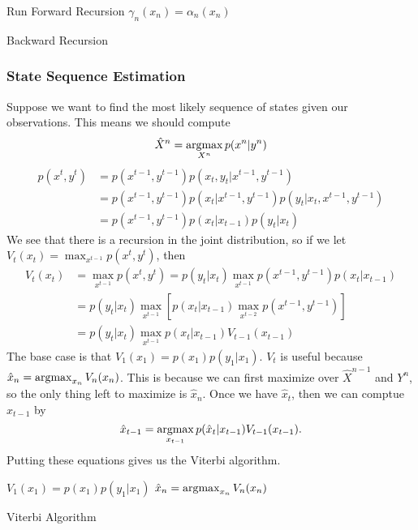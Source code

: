 \begin{gitbook-image}
\begin{algorithm}[H]
	\SetAlgoLined
	Run Forward Recursion\;
	$\gamma_n(x_n) = \alpha_n(x_n)$\;
	\caption{Backward Recursion}
\end{algorithm}
\end{gitbook-image}
\subsubsection{State Sequence Estimation}
Suppose we want to find the most likely sequence of states given our observations.
This means we should compute \[
	\hat{X}^n = \operatorname*{argmax}_{X^n}p(x^n|y^n)
\]
\begin{align*}
	p(x^t, y^t) &= p(x^{t-1}, y^{t-1})p(x_t, y_t|x^{t-1},y^{t-1})\\
	&= p(x^{t-1}, y^{t-1})p(x_t|x^{t-1},y^{t-1})p(y_t|x_t,x^{t-1},y^{t-1}) \\
	&= p(x^{t-1},y^{t-1})p(x_t|x_{t-1})p(y_t|x_t)
\end{align*}
We see that there is a recursion in the joint distribution, so if we let $V_t(x_t) = \max_{x^{t-1}}p(x^t,y^t)$, then
\begin{align*}
	V_t(x_t) &= \max_{x^{t-1}} p(x^t, y^t) = p(y_t|x_t)\max_{x^{t-1}}p(x^{t-1},y^{t-1})p(x_t|x_{t-1})\\
	&= p(y_t|x_t)\max_{x^{t-1}}\left[p(x_t|x_{t-1}) \max_{x^{t-2}} p(x^{t-1},y^{t-1})\right]\\
	&= p(y_t|x_t)\max_{x^{t-1}}p(x_t|x_{t-1}) V_{t-1}(x_{t-1})
\end{align*}
The base case is that $V_1(x_1) = p(x_1)p(y_1|x_1)$.
$V_t$ is useful because $\hat{x}_n = \operatorname*{argmax}_{x_n}V_n(x_n)$.
This is because we can first maximize over $\hat{X}^{n-1}$ and $Y^n$, so the only thing left to maximize is $\hat{x}_n$.
Once we have $\hat{x}_t$, then we can comptue $\hat{x}_{t-1}$ by \[
	\hat{x}_{t-1} = \operatorname*{argmax}_{x_{t-1}}p(\hat{x}_t|x_{t-1})V_{t-1}(x_{t-1}).
\]
Putting these equations gives us the Viterbi algorithm.

\begin{gitbook-image}
\begin{algorithm}[H]
	\SetAlgoLined
	$V_1(x_1) = p(x_1)p(y_1|x_1)$\;
	$\hat{x}_n = \operatorname*{argmax}_{x_n} V_n(x_n)$\;
	\caption{Viterbi Algorithm}
\end{algorithm}
\end{gitbook-image}
